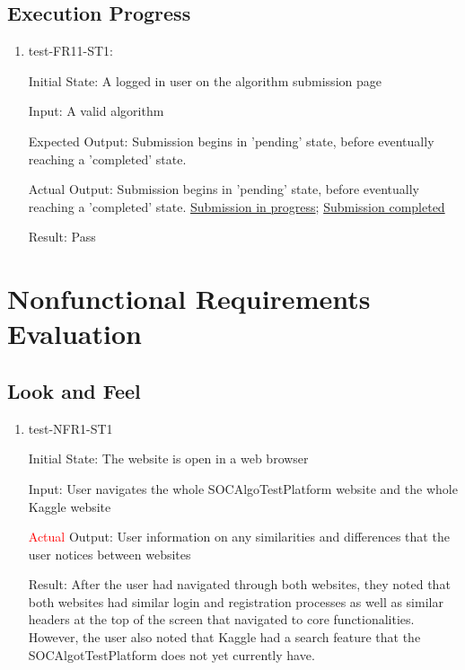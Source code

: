 \documentclass[12pt, titlepage]{article}
\begin{document}
\subsection{Execution Progress}
\begin{enumerate}
    \item test-FR11-ST1:\label{test-FR11-ST1}
    
    Initial State: A logged in user on the algorithm submission page
    
    Input: A valid algorithm
    
    Expected Output: Submission begins in 'pending' state, before eventually reaching a 'completed' state.
    
    Actual Output: Submission begins in 'pending' state, before eventually reaching a 'completed' state. \href{https://github.com/AidanMariglia/SOCAlgoTestPlatform/blob/main/docs/VnVReport/images/submission_pending.png}{Submission in progress}; \href{https://github.com/AidanMariglia/SOCAlgoTestPlatform/blob/main/docs/VnVReport/images/submission_completed.png}{Submission completed} 
    
    Result: Pass
\end{enumerate}
\section{Nonfunctional Requirements Evaluation}

\subsection{Look and Feel}
\begin{enumerate}

\item{test-NFR1-ST1} \label{test-NFR1-ST1}

Initial State: The website is open in a web browser

Input: User navigates the whole SOCAlgoTestPlatform website and the whole Kaggle website

\textcolor{red}{Actual} Output: User information on any similarities and differences that the user notices between websites

Result: After the user had navigated through both websites, they noted that both websites had similar login and registration processes as well as similar headers at the top of the screen that navigated to core functionalities. However, the user also noted that Kaggle had a search feature that the SOCAlgotTestPlatform does not yet currently have. 
\end{enumerate}
		
\end{document}

